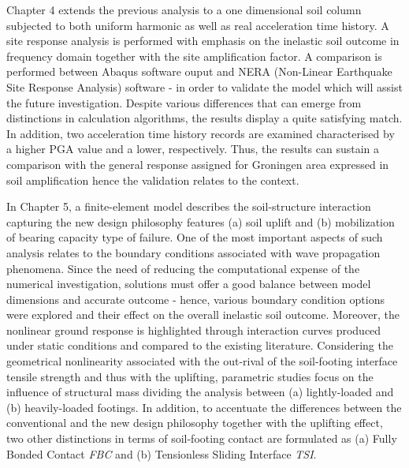 \documentclass[10pt,a4paper]{report}
\begin{document}
Chapter 4 extends the previous analysis to a one dimensional soil column subjected to both uniform harmonic as well as real acceleration time history. A site response analysis is performed with emphasis on the inelastic soil outcome in frequency domain together with the site amplification factor. A comparison is performed between Abaqus software ouput and NERA (Non-Linear Earthquake Site Response Analysis) software - in order to validate the model which will assist the future investigation. Despite various differences that can emerge from distinctions in calculation algorithms, the results display a quite satisfying match. In addition, two acceleration time history records  are examined characterised by a higher PGA value and a lower, respectively. Thus, the results can sustain a comparison with the general response assigned for Groningen area expressed in soil amplification hence the validation relates to the context.

In Chapter 5, a finite-element model describes the soil-structure interaction capturing the new design philosophy features (a) soil uplift and (b) mobilization of bearing capacity type of failure. One of the most important aspects of such analysis relates to the boundary conditions associated with wave propagation phenomena. Since the need of reducing the computational expense of the numerical investigation, solutions must offer a good balance between model dimensions and accurate outcome - hence, various boundary condition options were explored and their effect on the overall inelastic soil outcome. Moreover, the nonlinear ground response is highlighted through interaction curves produced under static conditions and compared to the existing literature. Considering the geometrical nonlinearity associated with the out-rival of the soil-footing interface tensile strength and thus with the uplifting, parametric studies focus on the influence of structural mass dividing the analysis between (a) lightly-loaded and (b) heavily-loaded footings. In addition, to accentuate the differences between the conventional and the new design philosophy together with the uplifting effect, two other distinctions in terms of soil-footing contact are formulated as (a) Fully Bonded Contact \textit{FBC} and (b) Tensionless Sliding Interface \textit{TSI}.
\end{document}
